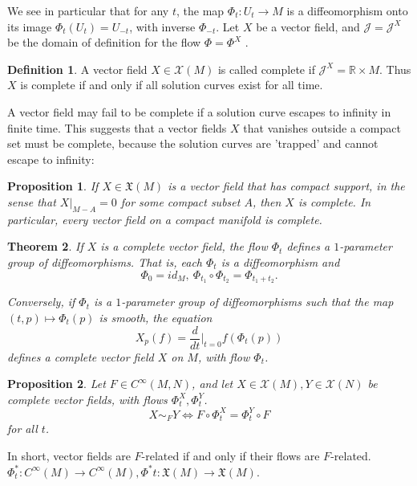 \documentclass{article}
\newtheorem{theorem}{Theorem}[section]
\newtheorem{proposition}{Proposition}[theorem]
\theoremstyle{definition}
\newtheorem{defn}[theorem]{Definition}
\newenvironment{definition}
  {\vspace{8pt}\begin{mdframed}[backgroundcolor=blueish]\begin{defn}}
  {\end{defn}\end{mdframed}\vspace{4pt}}
\begin{document}
We see in particular that for any $t$, the map $\Phi_t : U_t \rightarrow M$ is a diffeomorphism onto its image $\Phi_t(U_t) = U_{-t}$, with inverse $\Phi_{-t}$. Let $X$ be a vector field, and $\mathscr J = \mathscr J^X$ be the domain of definition for the flow $\Phi = \Phi^X$ .


\begin{definition}
A vector field $X \in \mathscr X (M)$ is called complete if $\mathscr J^X = \mathbb R \times M$. Thus $X$ is complete if and only if all solution curves exist for all time.
\end{definition}

A vector field may fail to be complete if a solution curve escapes to infinity in finite time. This suggests that a vector fields $X$ that vanishes outside a compact set must be complete, because the solution curves are 'trapped' and cannot escape to infinity:

\begin{proposition}

If $X \in \mathfrak X(M)$ is a vector field that has compact support, in the sense that $X |_{M-A} = 0$ for some compact subset $A$, then $X$ is complete. In particular, every vector field on a compact manifold is complete.
\end{proposition}

\begin{theorem}

If $X$ is a complete vector field, the flow $\Phi_t$ defines a $1$-parameter group of diffeomorphisms. That is, each $\Phi_t$ is a diffeomorphism and 
\[
    \Phi_0 = id_M, \  \Phi_{t_1} \circ \Phi_{t_2} = \Phi_{t_1+t_2}.
\]

Conversely, if $\Phi_t$ is a $1$-parameter group of diffeomorphisms such that the map $(t, p) \mapsto \Phi_t(p)$ is smooth, the equation
\[
    X_p(f) = \frac{d}{dt} \Bigr  |_{t=0} f(\Phi_{t}(p)) 
\]
defines a complete vector field $X$ on $M$, with flow $\Phi_t$.
\end{theorem}

\begin{proposition}
Let $F \in C^\infty(M,N)$, and let $X \in \mathscr X(M), Y \in \mathscr X(N)$ be complete vector fields, with flows $\Phi^X_t , \Phi^Y_t$.
\[
    X \sim_F Y \iff F \circ \Phi^X_t = \Phi^Y_t \circ F
\]
for all $t$.
\end{proposition}

In short, vector fields are $F$-related if and only if their flows are $F$-related. $\Phi^*_t : C^\infty (M) \rightarrow C^\infty (M), \Phi^* t : \mathfrak X(M) \rightarrow \mathfrak X(M)$. 
\end{document}
